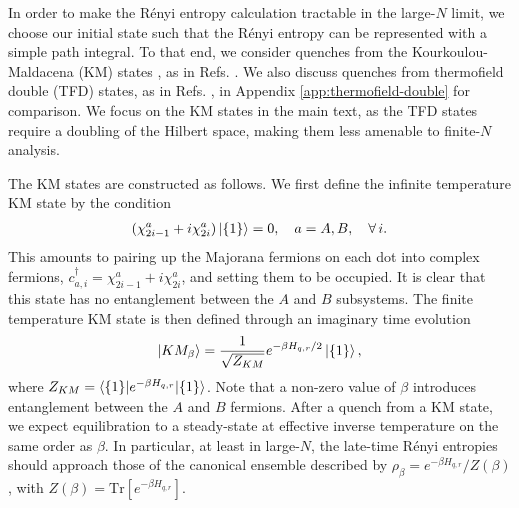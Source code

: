 \documentclass[reprint, floatfix,eqsecnum,superscriptaddress,preprint,nofootinbib,onecolumn,amsmath,amssymb,aps,prb]{revtex4-2}
\begin{document}
In order to make the R\'enyi entropy calculation tractable in the large-$N$ limit, we choose our initial state such that the R\'enyi entropy can be represented with a simple path integral. 
To that end, we consider quenches from the Kourkoulou-Maldacena (KM) states \cite{Kourkoulou2017}, as in Refs. \cite{Zhang2020b,Liu2020}. We also discuss quenches from thermofield double (TFD) states, as in Refs. \cite{Penington2019,Chen2020,Jian2021}, in Appendix \ref{app:thermofield-double} for comparison. We focus on the KM states in the main text, as the TFD states require a doubling of the Hilbert space, making them less amenable to finite-$N$ analysis.


The KM states are constructed as follows. We first define the infinite temperature KM state by the condition
\begin{align}
	(\chi_{2i-1}^a + i\chi_{2i}^a)\ket{\{1\}} = 0, \quad  a= A,B, \quad \forall \, i. \label{eqn:KM-inf-temp}
\end{align}
This amounts to pairing up the Majorana fermions on each dot into complex fermions, $c_{a,i}^\dagger = \chi_{2i-1}^a + i\chi_{2i}^a$, and setting them to be occupied. It is clear that this state has no entanglement between the $A$ and $B$ subsystems. The finite temperature KM state is then defined through an imaginary time evolution
\begin{align}
	\ket{KM_\beta} = \frac{1}{\sqrt{Z_{KM}}} e^{-\beta H_{q,r} / 2} \ket{\{1\}}, \label{eqn:KM-finite-temp}
\end{align}
where $Z_{KM} = \braket{\{1\}|e^{-\beta H_{q,r}} | \{1\}}$. Note that a non-zero value of $\beta$ introduces entanglement between the $A$ and $B$ fermions. 
After a quench from a KM state, we expect equilibration to a steady-state at effective inverse temperature on the same order as $\beta$. In particular, at least in large-$N$, the late-time R\'enyi entropies should approach those of the canonical ensemble described by $\rho_\beta = e^{-\beta H_{q,r}}/Z(\beta)$, with $Z(\beta) = \mathrm{Tr}[e^{-\beta H_{q,r}}]$.
\end{document}
